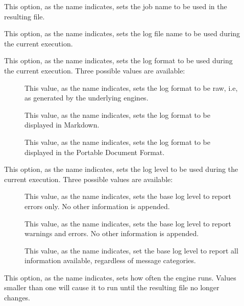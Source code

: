 \begin{description}
\begin{description}
\item[] This option, as the name indicates, sets the job name to be used in the resulting file.

\item[] This option, as the name indicates, sets the log file name to be used during the current execution.

\item[] This option, as the name indicates, sets the log format to be used during the current execution. Three possible values are available:

\begin{description}
\item[] This value, as the name indicates, sets the log format to be raw, i.e, as generated by the underlying engines.

\item[] This value, as the name indicates, sets the log format to be displayed in Markdown.

\item[] This value, as the name indicates, sets the log format to be displayed in the Portable Document Format.
\end{description}

\item[] This option, as the name indicates, sets the log level to be used during the current execution. Three possible values are available:

\begin{description}
\item[] This value, as the name indicates, sets the base log level to report errors only. No other information is appended.

\item[] This value, as the name indicates, sets the base log level to report warnings and errors. No other information is appended.

\item[] This value, as the name indicates, set the base log level to report all information available, regardless of message categories.
\end{description}

\item[] This option, as the name indicates, sets how often the engine runs. Values smaller than one will cause it to run until the resulting file no longer changes.


\end{description}
\end{description}
